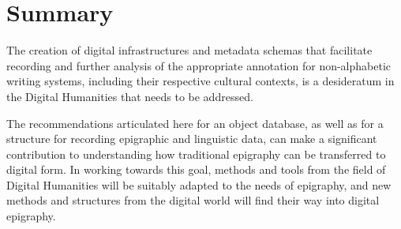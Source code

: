 \documentclass[amsthm,ebook]{saparticle}
\begin{document}
\section[Summary ]{Summary}
\noindent The creation of digital infrastructures and metadata schemas that facilitate recording and further analysis of the
appropriate annotation for non-alphabetic writing systems, including their respective cultural contexts, is a
desideratum in the Digital Humanities that needs to be addressed.

The recommendations articulated here for an object database, as well as for a structure for recording epigraphic and
linguistic data, can make a significant contribution to understanding how traditional epigraphy can be transferred to
digital form. In working towards this goal, methods and tools from the field of Digital Humanities will be suitably
adapted to the needs of epigraphy, and new methods and structures from the digital world will find their way into
digital epigraphy. 

\nocite{Gronemeyer2014}



\end{document}
